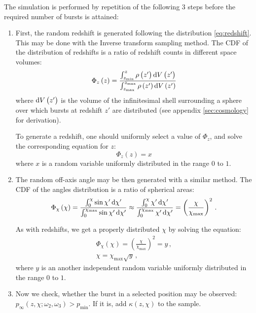\documentclass[manuscript]{aastex}
\begin{document}
The simulation is performed by repetition of the following 3 steps
before the required number of bursts is attained:
\begin{enumerate}
\item{
First, the random redshift is generated following the distribution
\ref{eq:redshift}. This may be done with the Inverse transform sampling
method. The CDF of the distribution of redshifts is a ratio of
 redshift counts in different space volumes:
	\begin{equation}
	\Phi_z\left(z\right) = \frac{\int_{z_\text{min}}^z \rho\left(z'\right) \dif V\left(z'\right)}{\int_{z_\text{max}}^{z_\text{max}} \rho\left(z'\right) \dif V\left(z'\right)}
	\end{equation}
	where $\dif V\left(z'\right)$ is the volume of the
        infinitesimal shell surrounding a sphere over which bursts at
        redshift $z'$ are distributed (see appendix
        \ref{sec:cosmology} for derivation).

To generate a redshift, one should uniformly select a value of
$\Phi_z$, and solve the corresponding equation for $z$:
	\begin{equation}
	\Phi_z\left(z\right) = x
	\end{equation}
where $x$ is a random variable uniformly distributed in the range $0$ to $1$.
}
\item{ The random off-axis angle may be then generated with a similar
  method. The CDF of the angles distribution is a ratio of spherical
  areas:
	\begin{equation}
	\Phi_\chi\left(\chi\right) = \frac{\int_0^\chi \sin\chi' \dif\chi'}{\int_0^{\chi_\text{max}} \sin\chi' \dif\chi'} \approx \frac{\int_0^\chi \chi' \dif\chi'}{\int_0^{\chi_\text{max}} \chi' \dif\chi'} = \left(\frac{\chi}{\chi_\text{max}}\right)^2\,.
	\end{equation}

	As with redshifts, we get a properly distributed $\chi$ by solving the equation:
	\begin{align}
	\Phi_\chi\left(\chi\right) = \left(\frac{\chi}{\chi_\text{max}}\right)^2 = y\,, \\
	\chi = \chi_\text{max}\sqrt{y}\,,
	\end{align}
	where $y$ is an another independent random variable uniformly distributed in the range $0$ to $1$.
}
\item{Now we check, whether the burst in a selected position may be
  observed: $p_\infty\left(z,\chi;\omega_2,\omega_3\right) >
  p_\text{min}$. If it is, add $\kappa\left(z,\chi\right)$ to the
  sample.}
\end{enumerate}
\end{document}

